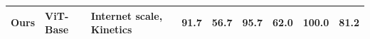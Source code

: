 \begin{table}[!t]
{\begin{tabular}{lllcccccc}
\rowcolor[HTML]{DCD5E0} 
\textbf{Ours} & ViT-Base & Internet scale, Kinetics & \bf 91.7 & 56.7 & \bf 95.7 & \bf 62.0 & \bf 100.0 & \bf 81.2 \\

\bottomrule
\end{tabular}%
}
\label{tab:franka}
\vspace{-3pt}
\end{table}
